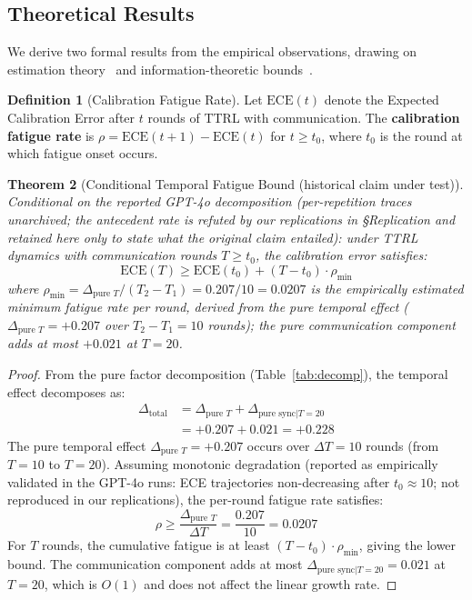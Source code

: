 \documentclass[11pt]{article}
\newcommand{\ECE}{\ensuremath{\mathrm{ECE}}}
\newtheorem{theorem}{Theorem}
\theoremstyle{definition}
\newtheorem{definition}[theorem]{Definition}
\theoremstyle{remark}
\begin{document}
\subsection{Theoretical Results}

We derive two formal results from the empirical observations, drawing on estimation theory~\citep{lehmann1998theory} and information-theoretic bounds~\citep{cover2012elements}.

\begin{definition}[Calibration Fatigue Rate]
Let $\ECE(t)$ denote the Expected Calibration Error after $t$ rounds of TTRL with communication. The \textbf{calibration fatigue rate} is $\rho = \ECE(t+1) - \ECE(t)$ for $t \geq t_0$, where $t_0$ is the round at which fatigue onset occurs.
\end{definition}

\begin{theorem}[Conditional Temporal Fatigue Bound (historical claim under test)]\label{thm:fatigue}
Conditional on the reported GPT-4o decomposition (per-repetition traces unarchived; the antecedent rate is refuted by our replications in \S Replication and retained here only to state what the original claim entailed): under TTRL dynamics with communication rounds $T \geq t_0$, the calibration error satisfies:
\begin{equation}
    \ECE(T) \geq \ECE(t_0) + (T - t_0) \cdot \rho_{\min}
\end{equation}
where $\rho_{\min} = \Delta_{\text{pure } T}/(T_2 - T_1) = 0.207/10 = 0.0207$ is the empirically estimated minimum fatigue rate per round, derived from the pure temporal effect ($\Delta_{\text{pure } T} = +0.207$ over $T_2 - T_1 = 10$ rounds); the pure communication component adds at most $+0.021$ at $T{=}20$.
\end{theorem}

\begin{proof}
From the pure factor decomposition (Table~\ref{tab:decomp}), the temporal effect decomposes as:
\begin{align}
    \Delta_{\text{total}} &= \Delta_{\text{pure } T} + \Delta_{\text{pure sync}|T=20} \\
    &= +0.207 + 0.021 = +0.228
\end{align}
The pure temporal effect $\Delta_{\text{pure } T} = +0.207$ occurs over $\Delta T = 10$ rounds (from $T{=}10$ to $T{=}20$). Assuming monotonic degradation (reported as empirically validated in the GPT-4o runs: ECE trajectories non-decreasing after $t_0 \approx 10$; not reproduced in our replications), the per-round fatigue rate satisfies:
\begin{equation}
    \rho \geq \frac{\Delta_{\text{pure } T}}{\Delta T} = \frac{0.207}{10} = 0.0207
\end{equation}
For $T$ rounds, the cumulative fatigue is at least $(T - t_0) \cdot \rho_{\min}$, giving the lower bound. The communication component adds at most $\Delta_{\text{pure sync}|T=20} = 0.021$ at $T{=}20$, which is $O(1)$ and does not affect the linear growth rate.
\end{proof}
\end{document}
